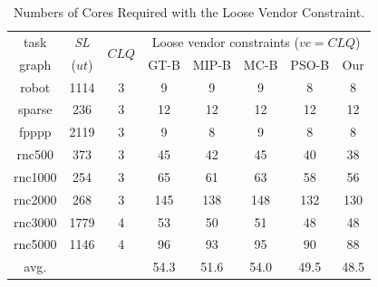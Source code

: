 \documentclass[10pt,journal, compsoc]{IEEEtran}
\begin{document}
\begin{table}[h]
\renewcommand{\arraystretch}{1.1}
\caption{Numbers of Cores Required with the Loose Vendor Constraint.}
\centering
\begin{tabular}{c|c|c|ccccc}
\hline
\hline

task       &\textit{SL}     &\multicolumn{1}{c|}{\multirow{2}{*}{\hspace{-0.2em}$CLQ$\hspace{-0.2em}}}    & \multicolumn{5}{c}{Loose vendor constraints ($vc=CLQ$)}      \\   \cline{4-8}

graph                           &($ut$)          &             &GT-B   &MIP-B &MC-B  &PSO-B &Our         \\
\hline
\hline

robot              &1114    &3            &9  &9  &9 &8    &8       \\

sparse              &236    &3            &12  &12  &12 &12    &12        \\

fpppp              &2119    &3            &9  &8  &9 &8    &8         \\

rnc500            &373      &3            &45  &42  &45 &40    &38          \\

rnc1000            &254     &3            &65  &61  &63 &58    &56        \\

rnc2000           &268      &3            &145  &138  &148 &132    &130      \\

rnc3000           &1779     &4            &53  &50  &51 &48    &48        \\

rnc5000           &1146     &4            &96  &93  &95 &90    &88        \\

\hline
avg.              &         &             &54.3  &51.6  &54.0 &49.5    &48.5         \\
\hline
\hline
\end{tabular}
\label{table:core_usage_loose}
\end{table}
\end{document}
